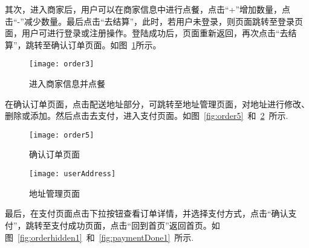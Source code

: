 其次，进入商家后，用户可以在商家信息中进行点餐，点击“+”增加数量，点击“-”减少数量。最后点击“去结算”，此时，若用户未登录，则页面跳转至登录页面，用户可进行登录或注册操作。登陆成功后，页面重新返回，再次点击“去结算”，跳转至确认订单页面。如图~\ref{fig:order3}所示。
\begin{figure}[htbp]
    \centering
    \texttt{[image: order3]}
    \caption{进入商家信息并点餐}\label{fig:order3}
\end{figure}

在确认订单页面，点击配送地址部分，可跳转至地址管理页面，对地址进行修改、删除或添加。然后点击去支付，进入支付页面。如图~\ref{fig:order5}~和~\ref{fig:userAddress}~所示.
\begin{figure}[htbp]
    \centering
    \begin{minipage}{0.4\textwidth}
        \centering
        \texttt{[image: order5]}
        \caption{确认订单页面}\label{fig:order5}
    \end{minipage}
    \begin{minipage}{0.4\textwidth}
        \centering
        \texttt{[image: userAddress]}
        \caption{地址管理页面}\label{fig:userAddress}
    \end{minipage}
    \vspace{\baselineskip}
\end{figure}

最后，在支付页面点击下拉按钮查看订单详情，并选择支付方式，点击“确认支付”，跳转至支付成功页面，点击“回到首页”返回首页。如图~\ref{fig:orderhidden1}~和~\ref{fig:paymentDone1}~所示.

